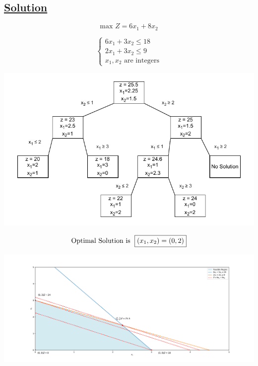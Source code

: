 \vspace{1cm}
\subsection*{\underline{Solution}}
\[ \text{max } Z = 6x_1 + 8x_2\]  

\[    
\left\{
    \begin{array}{l}
        6x_{1} + 3x_{2} \leq 18 \\[2pt]
        2x_{1} + 3x_{2} \leq 9 \\[2pt]
        x_{1}, x_{2} \text{ are integers}
    \end{array}
    \right.
\]

\begin{center}
    \includegraphics{Exercice/PY/EX1/b1.drawio.pdf}
\end{center}

\vspace{0.5cm}

\[\text{Optimal Solution is }\hspace{0.1cm} \boxed{(x_1,x_2) = (0,2)}\]

\begin{center}
    \includegraphics[width = \textwidth]{Exercice/PY/EX1/ex1.1.pdf}
\end{center}


